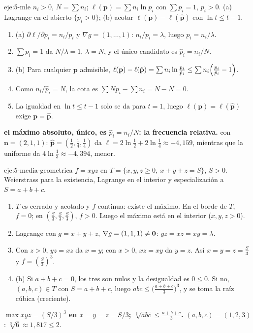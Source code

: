 \begin{solucion}{eje:5-mle}
\datos $n_i>0$, $N=\sum n_i$; $\ell(\mathbf p)=\sum n_i\ln p_i$ con $\sum p_i=1$, $p_i>0$.
\planteamiento (a) Lagrange en el abierto $\{p_i>0\}$; (b) acotar $\ell(\mathbf p)-\ell(\hat{\mathbf p})$ con $\ln t\le t-1$.
\pasos
\begin{enumerate}[label=\arabic*.]
  \item (a) $\partial\ell/\partial p_i=n_i/p_i$ y $\nabla g=(1,\dots,1)$: $n_i/p_i=\lambda$, luego $p_i=n_i/\lambda$.
  \item $\sum p_i=1$ da $N/\lambda=1$, $\lambda=N$, y el único candidato es $\hat p_i=n_i/N$.
  \item (b) Para cualquier $\mathbf p$ admisible, $\ell(\mathbf p)-\ell(\hat{\mathbf p})=\sum n_i\ln\frac{p_i}{\hat p_i}\le\sum n_i\Bigl(\frac{p_i}{\hat p_i}-1\Bigr)$.
  \item Como $n_i/\hat p_i=N$, la cota es $\sum Np_i-\sum n_i=N-N=0$.
  \item La igualdad en $\ln t\le t-1$ solo se da para $t=1$, luego $\ell(\mathbf p)=\ell(\hat{\mathbf p})$ exige $\mathbf p=\hat{\mathbf p}$.
\end{enumerate}
\resultado \textbf{el máximo absoluto, único, es $\hat p_i=n_i/N$: la frecuencia relativa.}
\comprobacion con $\mathbf n=(2,1,1)$: $\hat{\mathbf p}=(\frac12,\frac14,\frac14)$ da $\ell=2\ln\frac12+2\ln\frac14\approx-4{,}159$, mientras que la uniforme da $4\ln\frac13\approx-4{,}394$, menor.
\end{solucion}

\begin{solucion}{eje:5-media-geometrica}
\datos $f=xyz$ en $T=\{x,y,z\ge0,\ x+y+z=S\}$, $S>0$.
\planteamiento Weierstrass para la existencia, Lagrange en el interior y especialización a $S=a+b+c$.
\pasos
\begin{enumerate}[label=\arabic*.]
  \item $T$ es cerrado y acotado y $f$ continua: existe el máximo. En el borde de $T$, $f=0$; en $(\frac S3,\frac S3,\frac S3)$, $f>0$. Luego el máximo está en el interior ($x,y,z>0$).
  \item Lagrange con $g=x+y+z$, $\nabla g=(1,1,1)\neq\mathbf{0}$: $yz=xz=xy=\lambda$.
  \item Con $z>0$, $yz=xz$ da $x=y$; con $x>0$, $xz=xy$ da $y=z$. Así $x=y=z=\frac S3$ y $f=(\frac S3)^3$.
  \item (b) Si $a+b+c=0$, los tres son nulos y la desigualdad es $0\le0$. Si no, $(a,b,c)\in T$ con $S=a+b+c$, luego $abc\le\bigl(\frac{a+b+c}{3}\bigr)^3$, y se toma la raíz cúbica (creciente).
\end{enumerate}
\resultado \textbf{$\max xyz=(S/3)^3$ en $x=y=z=S/3$; $\sqrt[3]{abc}\le\frac{a+b+c}{3}$.}
\comprobacion $(a,b,c)=(1,2,3)$: $\sqrt[3]6\approx1{,}817\le2$.
\end{solucion}

